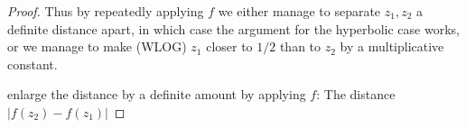 \begin{proof}
Thus by repeatedly applying $f$ we either manage to separate $z_1,z_2$ a definite distance apart, in which case the argument for the hyperbolic case works, or we manage to make (WLOG) $z_1$ closer to $1/2$ than to $z_2$ by a multiplicative constant.


enlarge the distance by a definite amount by applying $f$: The distance $|f(z_2)-f(z_1)|$

\begin{comment}
By compactness of $\mathcal{J}$, the derivative $\left|\left(f^{\circ n}\right)'\left(\zeta\right)\right|$
is uniformly bounded for a fixed $n$. Moreover, this distortion estimate
shows that the length of the curve scales with $n$ at exactly the
same rate in which the distance between the iterated images $f^{\circ n}(z_{0}),f^{\circ n}(z_{1})$
scale with $n$, so the curve $\gamma$ has a uniformly bounded quasiconvexity
constant, as needed.
\end{comment}

\begin{comment}

\section{Quasiconvexity for the cauliflower}

\subsection{All points on the boundary are accessible}

Let $J$\textbf{ }be the Julia set of $f(z)=z^{2}+\frac{1}{4}$. Denote
the filled Julia set by $K$.

The point $z=\frac{1}{2}$ will be denoted $p$.

\textbf{Claim. }The external ray which lands at the main cusp $p$
is a straight line.

\textbf{Proof. }There is a symmetry around the real line.$\square$

Let $\delta_{p}$ be the line segment lying on the real line which
joins the main cusp $p$ with $\gamma_{p,0}$.

By the previous claim, $\delta_{p}$ is a geodesic of the basin of
infinity.

Define $\delta_{q}$ for any cusp $q=f^{-n}(p)$ by taking the connected
component of the preimage $f^{-n}(\delta_{q})$ which contains $q$.

This is again a geodesic which lies on an external ray.


\end{comment}
\end{proof}
